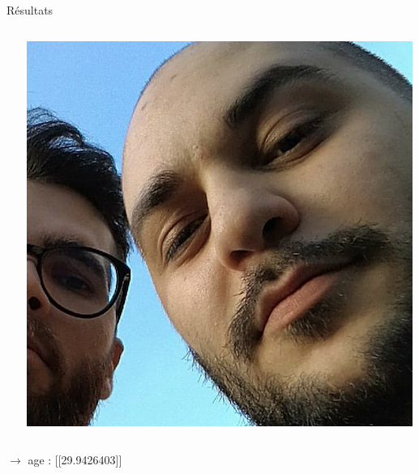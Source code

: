 \documentclass[compress]{beamer}
\begin{document}
\begin{frame}{Résultats}
  \begin{columns}
    \begin{column}{0.6\linewidth}
      \inputminted[fontsize=\scriptsize]{python}{code4.py}
    \end{column}
    \begin{column}{0.4\linewidth}
      \centering
      \includegraphics[width=\linewidth]{resources/giorgio-armani}
    \end{column}
  \end{columns}
    $\rightarrow$ age : [[29.9426403]]
\end{frame}
\end{document}
